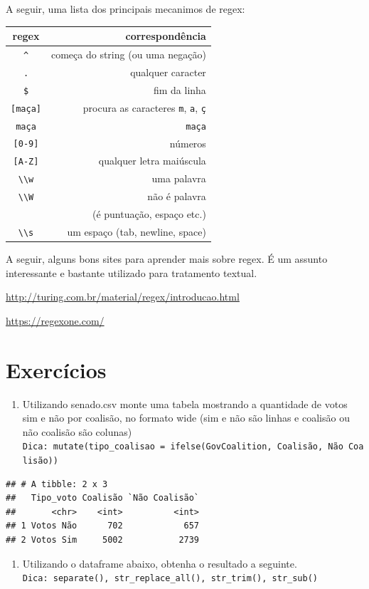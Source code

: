 \documentclass[]{book}
\providecommand{\tightlist}{%
  \setlength{\itemsep}{0pt}\setlength{\parskip}{0pt}}
\begin{document}
A seguir, uma lista dos principais mecanimos de regex:

\begin{longtable}[]{@{}cr@{}}
\toprule
regex & correspondência\tabularnewline
\midrule
\endhead
\texttt{\^{}} & começa do string (ou uma negação)\tabularnewline
\texttt{.} & qualquer caracter\tabularnewline
\texttt{\$} & fim da linha\tabularnewline
\texttt{{[}maça{]}} & procura as caracteres \texttt{m}, \texttt{a},
\texttt{ç}\tabularnewline
\texttt{maça} & \texttt{maça}\tabularnewline
\texttt{{[}0-9{]}} & números\tabularnewline
\texttt{{[}A-Z{]}} & qualquer letra maiúscula\tabularnewline
\texttt{\textbackslash{}\textbackslash{}w} & uma palavra\tabularnewline
\texttt{\textbackslash{}\textbackslash{}W} & não é
palavra\tabularnewline
& (é puntuação, espaço etc.)\tabularnewline
\texttt{\textbackslash{}\textbackslash{}s} & um espaço (tab, newline,
space)\tabularnewline
\bottomrule
\end{longtable}

A seguir, alguns bons sites para aprender mais sobre regex. É um assunto
interessante e bastante utilizado para tratamento textual.

\url{http://turing.com.br/material/regex/introducao.html}

\url{https://regexone.com/}

\section{Exercícios}\label{exercicios-4}

\begin{enumerate}
\def\labelenumi{\arabic{enumi}.}
\tightlist
\item
  Utilizando senado.csv monte uma tabela mostrando a quantidade de votos
  sim e não por coalisão, no formato wide (sim e não são linhas e
  coalisão ou não coalisão são colunas)
  \texttt{Dica:\ mutate(tipo\_coalisao\ =\ ifelse(GovCoalition,\ \textquotesingle{}Coalisão\textquotesingle{},\ \textquotesingle{}Não\ Coalisão\textquotesingle{}))}
\end{enumerate}

\begin{verbatim}
## # A tibble: 2 x 3
##   Tipo_voto Coalisão `Não Coalisão`
##       <chr>    <int>          <int>
## 1 Votos Não      702            657
## 2 Votos Sim     5002           2739
\end{verbatim}

\begin{enumerate}
\def\labelenumi{\arabic{enumi}.}
\setcounter{enumi}{1}
\tightlist
\item
  Utilizando o dataframe abaixo, obtenha o resultado a seguinte.
  \texttt{Dica:\ separate(),\ str\_replace\_all(),\ str\_trim(),\ str\_sub()}
\end{enumerate}
\end{document}
